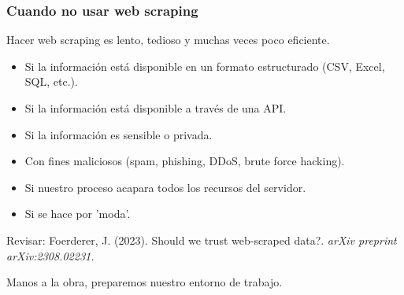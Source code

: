 \documentclass{beamer}
\begin{document}
\begin{frame}
	\frametitle{Cuando no usar web scraping}
	Hacer web scraping es lento, tedioso y muchas veces poco eficiente.
	\begin{itemize}
		\item Si la información está disponible en un formato estructurado (CSV, Excel, SQL, etc.).
		\item Si la información está disponible a través de una API.
		\item Si la información es sensible o privada.
		\item Con fines maliciosos (spam, phishing, DDoS, brute force hacking).
		\item Si nuestro proceso acapara todos los recursos del servidor.
		\item Si se hace por 'moda'.
	\end{itemize}
	\begin{block}{Revisar:}
		Foerderer, J. (2023). Should we trust web-scraped data?. \textit{arXiv preprint arXiv:2308.02231.}
	\end{block}
\end{frame}

\begin{frame}
	\begin{block}{}
		\centering
		\large{Manos a la obra, preparemos nuestro entorno de trabajo.}
	\end{block}
\end{frame}
\end{document}
